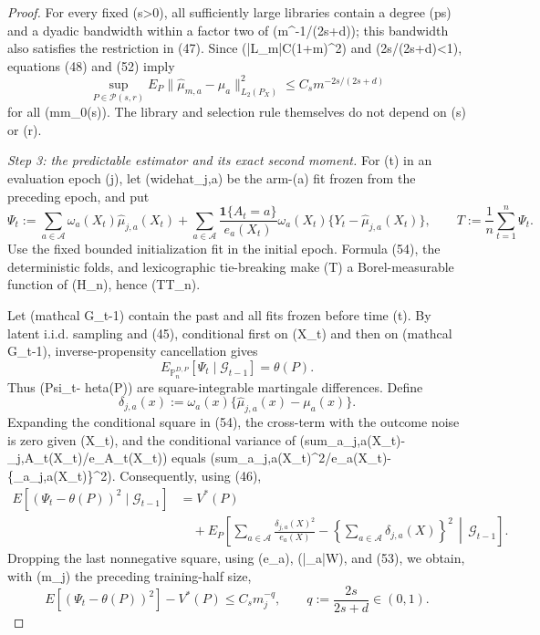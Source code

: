 \documentclass{article}
\begin{document}
\begin{proof}
For every fixed (s>0), all sufficiently large libraries contain a degree (p\geq\lfloor s\rfloor) and a dyadic bandwidth within a factor two of (m\textasciicircum{}{-1/(2s+d)}); this bandwidth also satisfies the restriction in (47).  Since (|\mathcal L\_m|\leq C(1+\log m)\textasciicircum{}2) and (2s/(2s+d)<1), equations (48) and (52) imply
\[
\sup_{P\in\mathcal P(s,r)}
E_P\|\widehat\mu_{m,a}-\mu_a\|_{L_2(P_X)}^2
\leq C_s m^{-2s/(2s+d)}
\tag{53}
\]
for all (m\geq m\_0(s)).  The library and selection rule themselves do not depend on (s) or (r).

\emph{Step 3: the predictable estimator and its exact second moment.}
For (t) in an evaluation epoch (j), let (widehat\mu\_{j,a}) be the arm-(a) fit frozen from the preceding epoch, and put
\[
\Psi_t
:=\sum_{a\in\mathcal A}\omega_a(X_t)\widehat\mu_{j,a}(X_t)
+\sum_{a\in\mathcal A}
\frac{\mathbf 1\{A_t=a\}}{e_a(X_t)}
\omega_a(X_t)\{Y_t-\widehat\mu_{j,a}(X_t)\},
\qquad
T:=\frac1n\sum_{t=1}^n\Psi_t.
\tag{54}
\]
Use the fixed bounded initialization fit in the initial epoch.  Formula (54), the deterministic folds, and lexicographic tie-breaking make (T) a Borel-measurable function of (H\_n), hence (T\in\mathfrak T\_n).

Let (mathcal G\_{t-1}) contain the past and all fits frozen before time (t).  By latent i.i.d. sampling and (45), conditional first on (X\_t) and then on (mathcal G\_{t-1}), inverse-propensity cancellation gives
\[
E_{\mathbb P_n^{D,P}}[\Psi_t\mid\mathcal G_{t-1}]=\theta(P).
\tag{55}
\]
Thus (Psi\_t-  heta(P)) are square-integrable martingale differences.  Define
\[
\delta_{j,a}(x):=\omega_a(x)\{\widehat\mu_{j,a}(x)-\mu_a(x)\}.
\]
Expanding the conditional square in (54), the cross-term with the outcome noise is zero given (X\_t), and the conditional variance of
(sum\_a\delta\_{j,a}(X\_t)-\delta\_{j,A\_t}(X\_t)/e\_{A\_t}(X\_t))
equals
(sum\_a\delta\_{j,a}(X\_t)\textasciicircum{}2/e\_a(X\_t)-\{\sum\_a\delta\_{j,a}(X\_t)\}\textasciicircum{}2).
Consequently, using (46),
\[
\begin{aligned}
E[(\Psi_t-\theta(P))^2\mid\mathcal G_{t-1}]
&=V^*(P)\\
&\quad+E_P\!\left[
\sum_{a\in\mathcal A}\frac{\delta_{j,a}(X)^2}{e_a(X)}
-\left\{\sum_{a\in\mathcal A}\delta_{j,a}(X)\right\}^2
\,\middle|\,\mathcal G_{t-1}
\right].
\tag{56}
\end{aligned}
\]
Dropping the last nonnegative square, using (e\_a\geq\varepsilon), (|\omega\_a|\leq W), and (53), we obtain, with (m\_j) the preceding training-half size,
\[
E[(\Psi_t-\theta(P))^2]-V^*(P)
\leq C_s m_j^{-q},
\qquad q:=\frac{2s}{2s+d}\in(0,1).
\tag{57}
\]


\end{proof}
\end{document}
